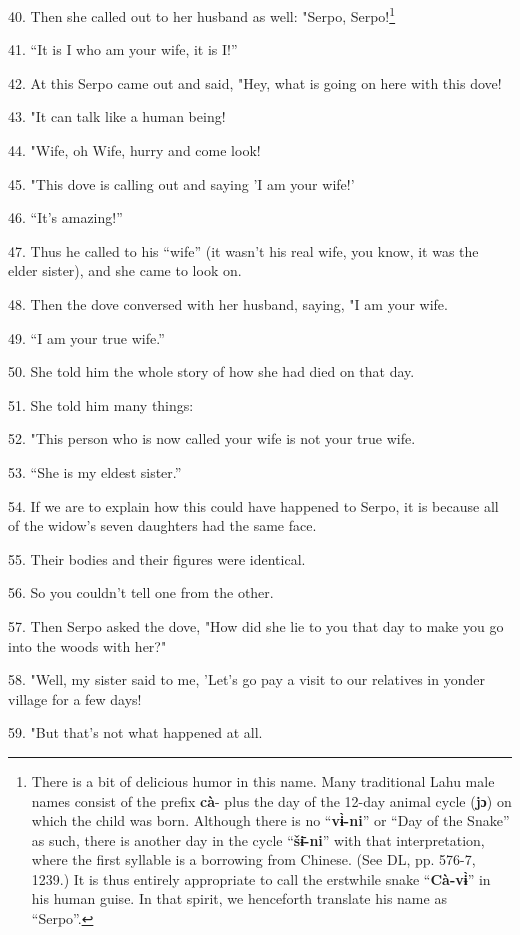 40. Then she called out to her husband as well: "Serpo, Serpo!\footnote{There is a bit of delicious humor in this name. Many traditional Lahu male names consist of the prefix \textbf{cà}- plus the day of the 12-day animal cycle (\textbf{jɔ}) on which the child was born. Although there is no ``\textbf{vɨ̀-ni}'' or ``Day of the Snake'' as such, there is another day in the cycle ``\textbf{šɨ̄-ni}'' with that interpretation, where the first syllable is a borrowing from Chinese. (See DL, pp. 576-7, 1239.) It is thus entirely appropriate to call the erstwhile snake ``\textbf{Cà-vɨ̀}'' in his human guise. In that spirit, we henceforth translate his name as ``Serpo''.}

41. ``It is I who am your wife, it is I!''

42. At this Serpo came out and said, "Hey, what is going on here with
this dove!

43. "It can talk like a human being!

44. "Wife, oh Wife, hurry and come look!

45. "This dove is calling out and saying 'I am your wife!'

46. ``It's amazing!''

47. Thus he called to his ``wife'' (it wasn't his real wife, you
know, it was the elder sister), and she came to look on.

48. Then the dove conversed with her husband, saying, "I am your wife.

49. ``I am your true wife.''

50. She told him the whole story of how she had died on that day.

51. She told him many things:

52. "This person who is now called your wife is not your true wife.

53. ``She is my eldest sister.''

54. If we are to explain how this could have happened to Serpo, it is because all
of the widow's seven daughters had the same face.

55. Their bodies and their figures were identical.

56. So you couldn't tell one from the other.

57. Then Serpo asked the dove, "How did she lie to you that day to make
you go into the woods with her?"

58. "Well, my sister said to me, 'Let's go pay a visit to our relatives
in yonder village for a few days!

59. "But that's not what happened at all.

